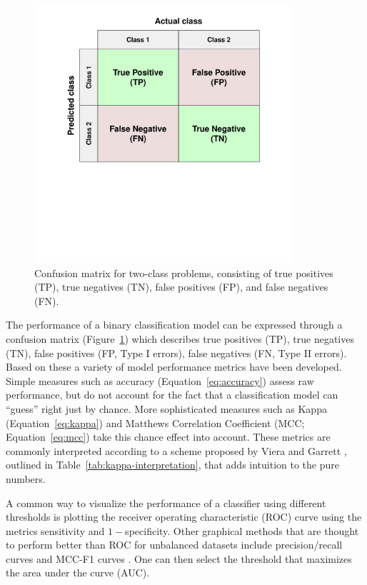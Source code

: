 \documentclass[11pt]{book}
\begin{document}
\begin{figure}[t]
\centering
\includegraphics[width=270pt,trim=0 6cm 0 0.5cm,clip]{img/confusion-matrix.pdf}
\caption[General Confusion Matrix]{Confusion matrix for two-class problems, consisting of true positives (TP), true negatives (TN), false positives (FP), and false negatives (FN).}
\label{fig:confusion-matrix}
\end{figure}

The performance of a binary classification model can be expressed through a confusion matrix (Figure~\ref{fig:confusion-matrix}) which describes true positives (TP), true negatives (TN), false positives (FP, Type I errors), false negatives (FN, Type II errors). Based on these a variety of model performance metrics have been developed. Simple measures such as accuracy (Equation~\ref{eq:accuracy}) assess raw performance, but do not account for the fact that a classification model can ``guess'' right just by chance. More sophisticated measures such as Kappa (Equation~\ref{eq:kappa}) and Matthews Correlation Coefficient (MCC; Equation~\ref{eq:mcc}) take this chance effect into account. These metrics are commonly interpreted according to a scheme proposed by Viera and Garrett \cite{VieraGarrett:2005}, outlined in Table~\ref{tab:kappa-interpretation}, that adds intuition to the pure numbers.

A common way to visualize the performance of a classifier using different thresholds is plotting the receiver operating characteristic (ROC) curve using the metrics sensitivity and $1-$specificity. Other graphical methods that are thought to perform better than ROC for unbalanced datasets include precision/recall curves and MCC-F1 curves \cite{Cao:2020}. One can then select the threshold that maximizes the area under the curve (AUC).
\end{document}
